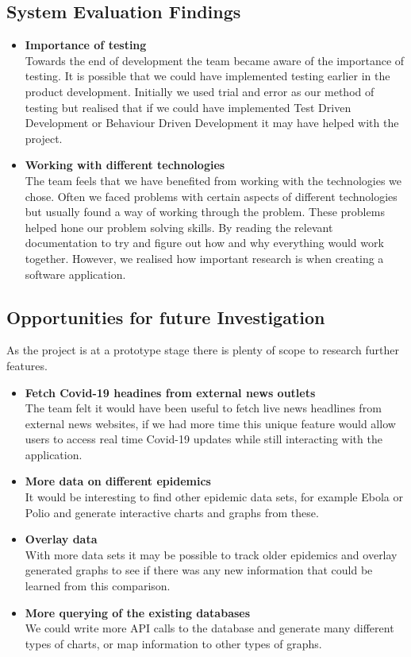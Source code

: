 \subsection{System Evaluation Findings}
\begin{itemize}
\item \textbf{Importance of testing}\\
Towards the end of development the team became aware of the importance of testing. It is possible that we could have implemented testing earlier in the product development. Initially we used trial and error as our method of testing but realised that if we could have implemented Test Driven Development or Behaviour Driven Development it may have helped with the project. 
\item \textbf{Working with different technologies}\\
The team feels that we have benefited from working with the technologies we chose. Often we faced problems with certain aspects of different technologies but usually found a way of working through the problem. These problems helped hone our problem solving skills. By reading the relevant documentation to try and figure out how and why everything would work together. However, we realised how important research is when creating a software application.

\end{itemize}

 \subsection{Opportunities for future Investigation}
As the project is at a prototype stage there is plenty of scope to research further features.
\begin{itemize}
\item \textbf{Fetch Covid-19 headines from external news outlets}\\
The team felt it would have been useful to fetch live news headlines from external news websites, if we had more time this unique feature would allow users to access real time Covid-19 updates while still interacting with the application.
\item \textbf{More data on different epidemics}\\
It would be interesting to find other epidemic data sets, for example Ebola or Polio and generate interactive charts and graphs from these.
\item \textbf{Overlay data}\\
With more data sets it may be possible to track older epidemics and overlay generated graphs to see if there was any new information that could be learned from this comparison.
\item \textbf{More querying of the existing databases}\\
We could write more API calls to the database and generate many different types of charts, or map information to other types of graphs.
\end{itemize}



